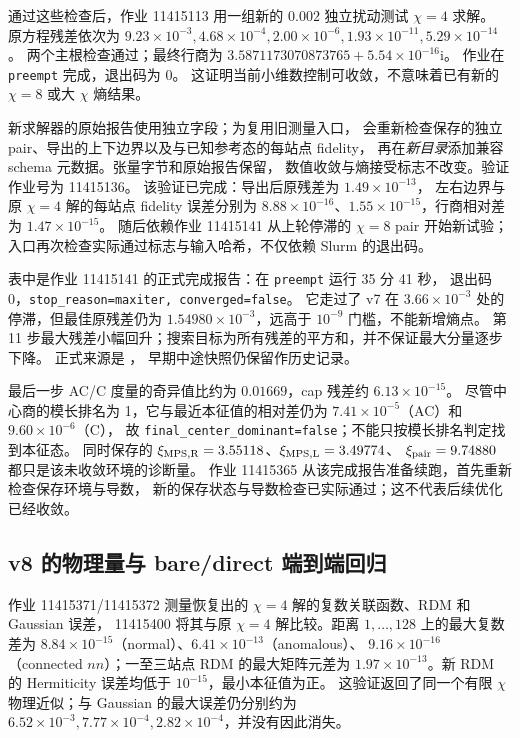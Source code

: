 \documentclass[11pt]{article}
\newcommand{\code}[1]{{\small\texttt{#1}}}
\begin{document}
通过这些检查后，作业 11415113 用一组新的 $0.002$ 独立扰动测试 $\chi=4$ 求解。
原方程残差依次为
$9.23\times10^{-3},4.68\times10^{-4},2.00\times10^{-6},1.93\times10^{-11},5.29\times10^{-14}$。
两个主根检查通过；最终行商为
$3.5871173070873765+5.54\times10^{-16}\mathrm{i}$。
作业在 \code{preempt} 完成，退出码为 0。
这证明当前小维数控制可收敛，不意味着已有新的 $\chi=8$ 或大 $\chi$ 熵结果。

新求解器的原始报告使用独立字段；为复用旧测量入口，
会重新检查保存的独立 pair、导出的上下边界以及与已知参考态的每站点 fidelity，
再在\emph{新目录}添加兼容 schema 元数据。张量字节和原始报告保留，
数值收敛与熵接受标志不改变。验证作业号为 11415136。
该验证已完成：导出后原残差为 $1.49\times10^{-13}$，
左右边界与原 $\chi=4$ 解的每站点 fidelity 误差分别为
$8.88\times10^{-16}$、$1.55\times10^{-15}$，行商相对差为 $1.47\times10^{-15}$。
随后依赖作业 11415141 从上轮停滞的 $\chi=8$ pair 开始新试验；
入口再次检查实际通过标志与输入哈希，不仅依赖 Slurm 的退出码。

\begin{center}\small

\end{center}
表中是作业 11415141 的正式完成报告：在 \code{preempt} 运行 35 分 41 秒，
退出码 0，\code{stop\_reason=maxiter, converged=false}。
它走过了 v7 在 $3.66\times10^{-3}$ 处的停滞，但最佳原残差仍为
$1.54980\times10^{-3}$，远高于 $10^{-9}$ 门槛，不能新增熵点。
第 11 步最大残差小幅回升；搜索目标为所有残差的平方和，并不保证最大分量逐步下降。
正式来源是 ，
早期中途快照仍保留作历史记录。

最后一步 AC/C 度量的奇异值比约为 $0.01669$，cap 残差约 $6.13\times10^{-15}$。
尽管中心商的模长排名为 1，它与最近本征值的相对差仍为
$7.41\times10^{-5}$（AC）和 $9.60\times10^{-6}$（C），
故 \code{final\_center\_dominant=false}；不能只按模长排名判定找到本征态。
同时保存的 $\xi_{\rm MPS,R}=3.55118$、$\xi_{\rm MPS,L}=3.49774$、
$\xi_{\rm pair}=9.74880$ 都只是该未收敛环境的诊断量。
作业 11415365 从该完成报告准备续跑，首先重新检查保存环境与导数，
新的保存状态与导数检查已实际通过；这不代表后续优化已经收敛。

\subsection{v8 的物理量与 bare/direct 端到端回归}
作业 11415371/11415372 测量恢复出的 $\chi=4$ 解的复数关联函数、RDM 和 Gaussian 误差，
11415400 将其与原 $\chi=4$ 解比较。距离 $1,\ldots,128$ 上的最大复数差为
$8.84\times10^{-15}$（normal）、$6.41\times10^{-13}$（anomalous）、
$9.16\times10^{-16}$（connected $nn$）；一至三站点 RDM 的最大矩阵元差为
$1.97\times10^{-13}$。新 RDM 的 Hermiticity 误差均低于 $10^{-15}$，最小本征值为正。
这验证返回了同一个有限 $\chi$ 物理近似；与 Gaussian 的最大误差仍分别约为
$6.52\times10^{-3},7.77\times10^{-4},2.82\times10^{-4}$，并没有因此消失。
\end{document}

